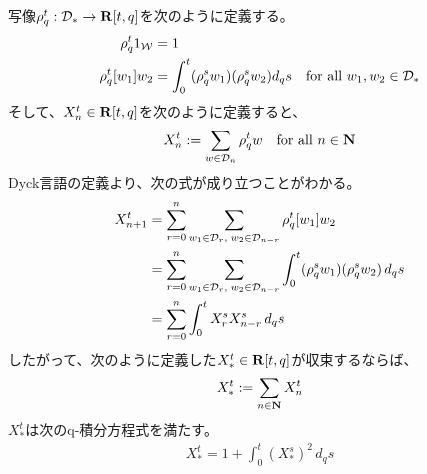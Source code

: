 {	写像$\rho_q^t:{{\mathcal{D}}}_*\to\mathbf{R}[t,q]$を次のように定義する。
	\begin{equation*}\begin{split}
		\rho_q^t 1_{{\mathcal{W}}} &= 1 \\ 
		\rho_q^t[w_1]w_2 &= \int_0^t(\rho_q^sw_1)(\rho_q^sw_2)d_qs
		\quad\text{for all } w_1,w_2\in{\ensuremath{{\mathcal{D}}}}_*
	\end{split}\end{equation*}
	そして、$X_n^t\in\mathbf{R}[t,q]$を次のように定義すると、
	\begin{equation*}\begin{split}
		X_n^t := \sum_{w\in{\ensuremath{{\mathcal{D}}}}_n}\rho_q^t w
		\quad\text{for all } n\in\mathbf{N}
	\end{split}\end{equation*}
	Dyck言語の定義より、次の式が成り立つことがわかる。
	\begin{equation*}\begin{split}
		X_{n+1}^t 
		&= \sum_{r=0}^n\sum_{w_1\in{\ensuremath{{\mathcal{D}}}}_r,\;w_2\in{\ensuremath{{\mathcal{D}}}}_{n-r}}
			\rho_q^t[w_1]w_2 \\
		&= \sum_{r=0}^n\sum_{w_1\in{\ensuremath{{\mathcal{D}}}}_r,\;w_2\in{\ensuremath{{\mathcal{D}}}}_{n-r}}
			\int_0^t(\rho_q^sw_1)(\rho_q^sw_2)\,d_qs \\
		&= \sum_{r=0}^n \int_0^t X_r^sX_{n-r}^s\,d_qs \\
	\end{split}\end{equation*}
	したがって、次のように定義した$X_*^t\in\mathbf{R}[t,q]$が収束するならば、
	\begin{equation*}\begin{split}
		X_*^t := \sum_{n\in\mathbf{N}} X_n^t
	\end{split}\end{equation*}
	$X_*^t$は次のq-積分方程式を満たす。
	\begin{equation*}\begin{split}
		X_*^t = 1 + \int_0^t(X_*^s)^2\,d_qs
	\end{split}\end{equation*}

}
